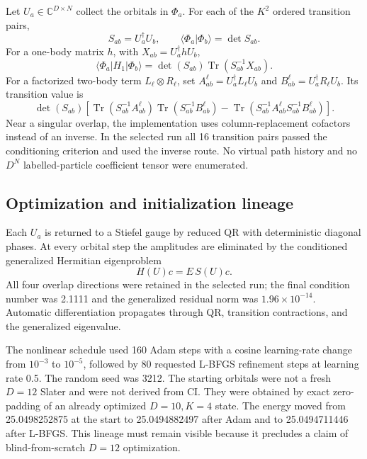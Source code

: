 \documentclass[11pt]{article}
\theoremstyle{definition}
\begin{document}
Let $U_a\in\mathbb C^{D\times N}$ collect the orbitals in $\Phi_a$.  For each
of the $K^2$ ordered transition pairs,
\begin{equation}
S_{ab}=U_a^\dagger U_b,
\qquad \langle\Phi_a|\Phi_b\rangle=\det S_{ab}.
\end{equation}
For a one-body matrix $h$, with $X_{ab}=U_a^\dagger hU_b$,
\begin{equation}
\langle\Phi_a|H_1|\Phi_b\rangle
=\det(S_{ab})\operatorname{Tr}(S_{ab}^{-1}X_{ab}).
\label{audit:onebody}
\end{equation}
For a factorized two-body term $L_\ell\otimes R_\ell$, set
$A_{ab}^{\ell}=U_a^\dagger L_\ell U_b$ and
$B_{ab}^{\ell}=U_a^\dagger R_\ell U_b$.  Its transition value is
\begin{equation}
\det(S_{ab})\left[
\operatorname{Tr}(S_{ab}^{-1}A_{ab}^{\ell})
\operatorname{Tr}(S_{ab}^{-1}B_{ab}^{\ell})
-\operatorname{Tr}(S_{ab}^{-1}A_{ab}^{\ell}
S_{ab}^{-1}B_{ab}^{\ell})\right].
\label{audit:twobody}
\end{equation}
Near a singular overlap, the implementation uses column-replacement cofactors
instead of an inverse.  In the selected run all 16 transition pairs passed the
conditioning criterion and used the inverse route.  No virtual path history
and no $D^N$ labelled-particle coefficient tensor were enumerated.

\subsection{Optimization and initialization lineage}

Each $U_a$ is returned to a Stiefel gauge by reduced QR with deterministic
diagonal phases.  At every orbital step the amplitudes are eliminated by the
conditioned generalized Hermitian eigenproblem
\begin{equation}
H(U)c=E\,S(U)c.
\end{equation}
All four overlap directions were retained in the selected run; the final
condition number was 2.1111 and the generalized residual norm was
$1.96\times10^{-14}$.  Automatic differentiation propagates through QR,
transition contractions, and the generalized eigenvalue.

The nonlinear schedule used 160 Adam steps with a cosine learning-rate change
from $10^{-3}$ to $10^{-5}$, followed by 80 requested L-BFGS refinement steps
at learning rate 0.5.  The random seed was 3212.  The starting orbitals were
not a fresh $D=12$ Slater and were not derived from CI.  They were obtained by
exact zero-padding of an already optimized $D=10,K=4$ state.  The energy moved
from 25.0498252875 at the start to 25.0494882497 after Adam and to
25.0494711446 after L-BFGS.  This lineage must remain visible because it
precludes a claim of blind-from-scratch $D=12$ optimization.
\end{document}
